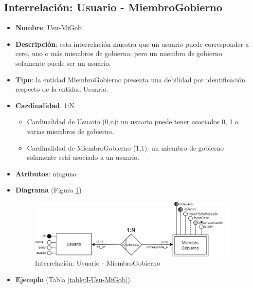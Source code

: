 \subsection{Interrelación: Usuario - MiembroGobierno}
\begin{itemize}
    \item \textbf{Nombre}: Usu-MiGob.
    \item \textbf{Descripción}: esta interrelación muestra que un usuario puede corresponder a cero, uno o más miembros de gobierno, pero un miembro de gobierno solamente puede ser un usuario.
    \item \textbf{Tipo}: la entidad MiembroGobierno presenta una debilidad por identificación respecto de la entidad Usuario.
    \item \textbf{Cardinalidad}. 1:N
    \begin{itemize}
        \item Cardinalidad de Usuario (0,n): un usuario puede tener asociados 0, 1 o varias miembros de gobierno.
        \item Cardinalidad de MiembroGobierno (1,1): un miembro de gobierno solamente está asociado a un usuario.
    \end{itemize}
    \item \textbf{Atributos}: ninguno
    \item \textbf{Diagrama} (Figura \ref{fig:I-Usu-MiGob}) 
    \begin{figure}[H]
        \centering
        \includegraphics[scale=0.7]{img/diagramas/EER/I-Usu-MiGob}
        \caption{Interrelación: Usuario - MiembroGobierno}
        \label{fig:I-Usu-MiGob}
    \end{figure}
    
    \item \textbf{Ejemplo} (Tabla \ref{table:I-Usu-MiGob}).


\end{itemize}
